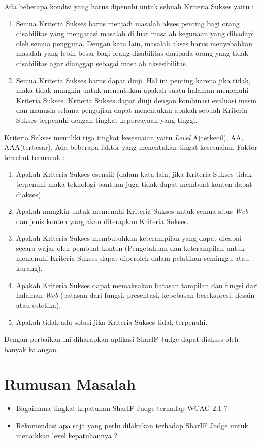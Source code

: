 \documentclass[a4paper,twoside]{article}
\begin{document}
Ada beberapa kondisi yang harus dipenuhi untuk sebuah Kriteria Sukses yaitu :

\begin{enumerate}
	\item Semua Kriteria Sukses harus menjadi masalah akses penting bagi orang disabilitas yang mengatasi masalah di luar masalah kegunaan yang dihadapi oleh semua pengguna. Dengan kata lain, masalah akses harus menyebabkan masalah yang lebih besar bagi orang disabilitas daripada orang yang tidak disabilitas agar dianggap sebagai masalah aksesibilitas.
	\item Semua Kriteria Sukses harus dapat diuji. Hal ini penting karena jika tidak, maka tidak mungkin untuk menentukan apakah suatu halaman memenuhi Kriteria Sukses. Kriteria Sukses dapat diuji dengan kombinasi evaluasi mesin dan manusia selama pengujian dapat menentukan apakah sebuah Kriteria Sukses terpenuhi dengan tingkat kepercayaan yang tinggi.
\end{enumerate}

Kriteria Sukses memiliki tiga tingkat kesesuaian yaitu \textit{Level} A(terkecil), AA, AAA(terbesar). Ada beberapa faktor yang menentukan tingat kesesuaian. Faktor tersebut termasuk :

\begin{enumerate}
	\item Apakah Kriteria Sukses esensiil (dalam kata lain, jika Kriteria Sukses tidak terpenuhi maka teknologi bantuan juga tidak dapat membuat konten dapat diakses).
	\item Apakah mungkin untuk memenuhi Kriteria Sukses untuk semua situs \textit{Web} dan jenis konten yang akan diterapkan Kriteria Sukses.
	\item Apakah Kriteria Sukses membutuhkan keterampilan yang dapat dicapai secara wajar oleh pembuat konten (Pengetahuan dan keterampilan untuk memenuhi Kriteria Sukses dapat diperoleh dalam pelatihan seminggu atau kurang).
	\item Apakah Kriteria Sukses dapat memaksakan batasan tampilan dan fungsi dari halaman \textit{Web} (batasan dari fungsi, presentasi, kebebasan berekspresi, desain atau estetika).
	\item Apakah tidak ada solusi jika Kriteria Sukses tidak terpenuhi.
\end{enumerate}

Dengan perbaikan ini diharapkan aplikasi SharIF Judge dapat diakses oleh banyak kalangan.

\section{Rumusan Masalah}
\begin{itemize}
	\item Bagaimana tingkat kepatuhan SharIF Judge terhadap WCAG 2.1 ?
	\item Rekomendasi apa saja yang perlu dilakukan terhadap SharIF Judge untuk menaikkan level kepatuhannya ?
\end{itemize}
\end{document}
